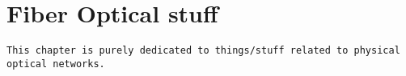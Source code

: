 \chapter{Fiber Optical stuff}

\texttt{This chapter is purely dedicated to things/stuff related to physical optical networks.}


